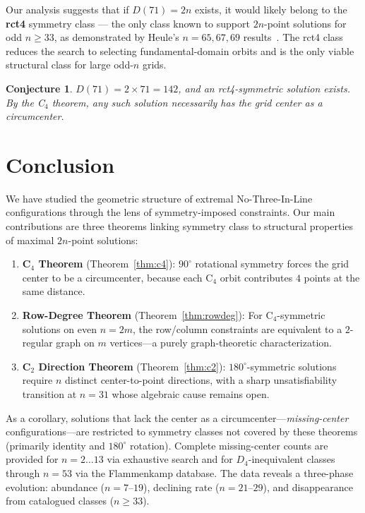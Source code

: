 \documentclass[11pt,a4paper]{article}
\theoremstyle{plain}
\newtheorem{conjecture}[theorem]{Conjecture}
\theoremstyle{definition}
\begin{document}
Our analysis suggests that if $D(71)=2n$ exists, it would likely belong to the \textbf{rct4} symmetry class --- the only class known to support $2n$-point solutions for odd $n\ge 33$, as demonstrated by Heule's $n=65,67,69$ results~\cite{heule2026}. The rct4 class reduces the search to selecting fundamental-domain orbits and is the only viable structural class for large odd-$n$ grids.

\begin{conjecture}
$D(71)=2\times71=142$, and an rct4-symmetric solution exists. By the C$_4$ theorem, any such solution necessarily has the grid center as a circumcenter.
\end{conjecture}

\section{Conclusion}
\label{sec:conc}

We have studied the geometric structure of extremal No-Three-In-Line configurations through the lens of symmetry-imposed constraints. Our main contributions are three theorems linking symmetry class to structural properties of maximal $2n$-point solutions:

\begin{enumerate}[nosep]
\item \textbf{C$_4$ Theorem} (Theorem~\ref{thm:c4}): $90^\circ$ rotational symmetry forces the grid center to be a circumcenter, because each C$_4$ orbit contributes $4$ points at the same distance.
\item \textbf{Row-Degree Theorem} (Theorem~\ref{thm:rowdeg}): For C$_4$-symmetric solutions on even $n=2m$, the row/column constraints are equivalent to a $2$-regular graph on $m$ vertices---a purely graph-theoretic characterization.
\item \textbf{C$_2$ Direction Theorem} (Theorem~\ref{thm:c2}): $180^\circ$-symmetric solutions require $n$ distinct center-to-point directions, with a sharp unsatisfiability transition at $n=31$ whose algebraic cause remains open.
\end{enumerate}

As a corollary, solutions that lack the center as a circumcenter---\emph{missing-center} configurations---are restricted to symmetry classes not covered by these theorems (primarily identity and $180^\circ$ rotation). Complete missing-center counts are provided for $n=2\dots13$ via exhaustive search and for $D_4$-inequivalent classes through $n=53$ via the Flammenkamp database. The data reveals a three-phase evolution: abundance ($n=7$--$19$), declining rate ($n=21$--$29$), and disappearance from catalogued classes ($n\ge 33$).
\end{document}
